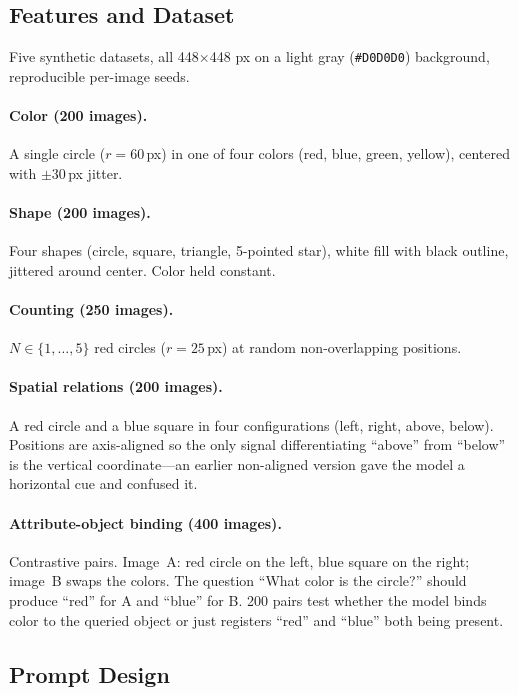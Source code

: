 \documentclass{article}
\begin{document}
\subsection{Features and Dataset}

Five synthetic datasets, all 448$\times$448 px on a light gray (\texttt{\#D0D0D0}) background, reproducible per-image seeds.

\paragraph{Color (200 images).} A single circle ($r{=}60$\,px) in one of four colors (red, blue, green, yellow), centered with $\pm30$\,px jitter.

\paragraph{Shape (200 images).} Four shapes (circle, square, triangle, 5-pointed star), white fill with black outline, jittered around center.
Color held constant.

\paragraph{Counting (250 images).} $N \in \{1,\ldots,5\}$ red circles ($r{=}25$\,px) at random non-overlapping positions.

\paragraph{Spatial relations (200 images).} A red circle and a blue square in four configurations (left, right, above, below).
Positions are axis-aligned so the only signal differentiating ``above'' from ``below'' is the vertical coordinate---an earlier non-aligned version gave the model a horizontal cue and confused it.

\paragraph{Attribute-object binding (400 images).} Contrastive pairs.
Image~A: red circle on the left, blue square on the right; image~B swaps the colors.
The question ``What color is the circle?'' should produce ``red'' for A and ``blue'' for B.
200 pairs test whether the model binds color to the queried object or just registers ``red'' and ``blue'' both being present.

\subsection{Prompt Design}
\end{document}
